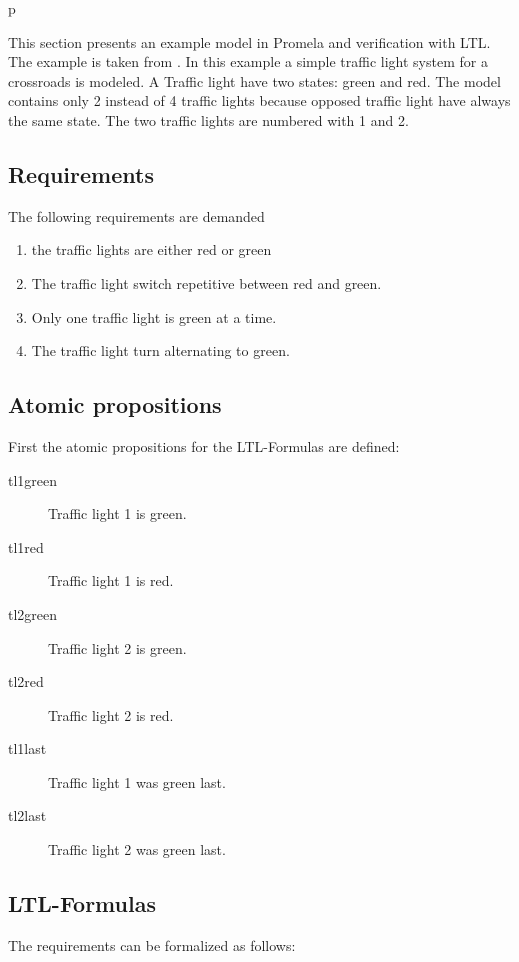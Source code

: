 p\documentclass[a4paper, twoside]{article}
\begin{document}
This section presents an example model in Promela and verification with LTL. The example is taken from \cite{kleuker09}. In this example a simple traffic light system for a crossroads is modeled. A Traffic light have two states: green and red. The model contains only 2 instead of 4 traffic lights because opposed traffic light have always the same state. The two traffic lights are numbered with 1 and 2.

\subsection{Requirements}
\label{sec:requirements}

The following requirements are demanded
\begin{enumerate}
\item the traffic lights are either red or green
\item The traffic light switch repetitive between red and green.
\item Only one traffic light is green at a time.
\item The traffic light turn alternating to green.
\end{enumerate}

\subsection{Atomic propositions}
\label{sec:trafficlightap}

First the atomic propositions for the LTL-Formulas are defined:

\begin{description}
\item[tl1green] Traffic light 1 is green.
\item[tl1red] Traffic light 1 is red.
\item[tl2green] Traffic light 2 is green.
\item[tl2red] Traffic light 2 is red.
\item[tl1last] Traffic light 1 was green last.
\item[tl2last] Traffic light 2 was green last.
\end{description}

\subsection{LTL-Formulas}
\label{sec:exampleltl}

The requirements can be formalized as follows:
\end{document}
